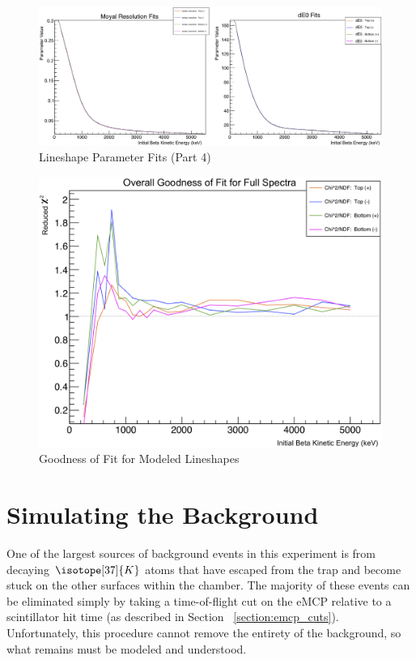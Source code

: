 \begin{figure}[h!!tb]
	\centering
	\includegraphics[width=.999\linewidth]
	{Figures/LineshapeParams_part4.png}
	\caption[Lineshape Parameter Fits (Part 4)]{Lineshape Parameter Fits (Part 4)}	
	\label{fig:lineshapeparams_part4}
\end{figure}
%
\begin{figure}[h!!tb]
	\centering
	\includegraphics[width=.999\linewidth]
	{Figures/Lineshape_Chi2.png}
	\caption[Goodness of Fit for Modeled Lineshapes]{Goodness of Fit for Modeled Lineshapes}	
	\label{fig:lineshape_redchi2}
\end{figure}
%


\FloatBarrier
\section{Simulating the Background}
\label{sec:tof_bg}
One of the largest sources of background events in this experiment is from decaying $\isotope[37]{K}$ atoms that have escaped from the trap and become stuck on the other surfaces within the chamber.  The majority of these events can be eliminated simply by taking a time-of-flight cut on the eMCP relative to a scintillator hit time (as described in Section ~\ref{section:emcp_cuts}).  Unfortunately, this procedure cannot remove the entirety of the background, so what remains must be modeled and understood.  



